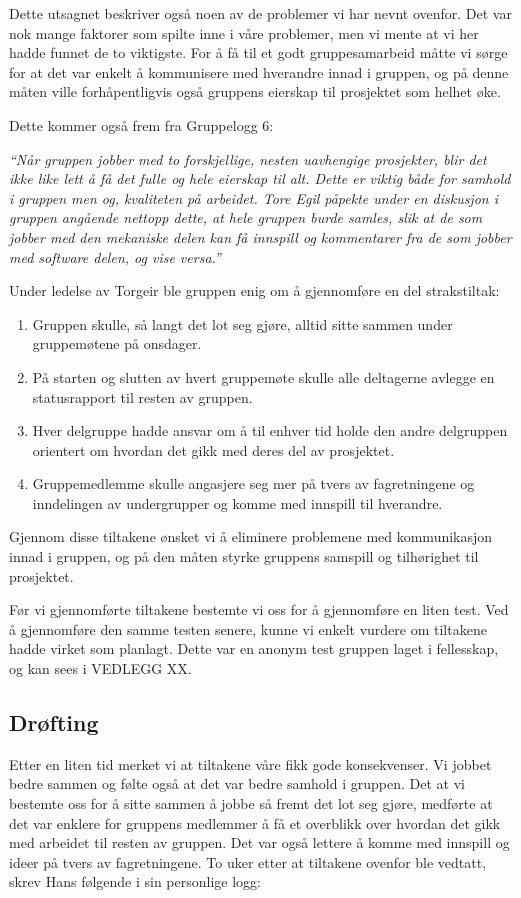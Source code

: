 Dette utsagnet beskriver også noen av de problemer vi har nevnt ovenfor. Det var nok mange faktorer som spilte inne i våre problemer, men vi mente at vi her hadde funnet de to viktigste. For å få til et godt gruppesamarbeid måtte vi sørge for at det var enkelt å kommunisere med hverandre innad i gruppen, og på denne måten ville forhåpentligvis også gruppens eierskap til prosjektet som helhet øke.

Dette kommer også frem fra Gruppelogg 6:\newline

\emph{``Når gruppen jobber med to forskjellige, nesten uavhengige prosjekter, blir det ikke like lett å få det fulle og hele eierskap til alt. Dette er viktig både for samhold i gruppen men og, kvaliteten på arbeidet. Tore Egil påpekte under en diskusjon i gruppen angående nettopp dette, at hele gruppen burde samles, slik at de som jobber med den mekaniske delen kan få innspill og kommentarer fra de som jobber med software delen, og vise versa.''}\newline

Under ledelse av Torgeir ble gruppen enig om å gjennomføre en del strakstiltak:

\begin{enumerate}
\item Gruppen skulle, så langt det lot seg gjøre, alltid sitte sammen under gruppemøtene på onsdager. 
\item På starten og slutten av hvert gruppemøte skulle alle deltagerne avlegge en statusrapport til resten av gruppen. 
\item Hver delgruppe hadde ansvar om å til enhver tid holde den andre delgruppen orientert om hvordan det gikk med deres del av prosjektet.
\item Gruppemedlemme skulle angasjere seg mer på tvers av fagretningene og inndelingen av undergrupper og komme med innspill til hverandre. 
\end{enumerate}

Gjennom disse tiltakene ønsket vi å eliminere problemene med kommunikasjon innad i gruppen, og på den måten styrke gruppens samspill og tilhørighet til prosjektet.\newline

Før vi gjennomførte tiltakene bestemte vi oss for å gjennomføre en liten test. Ved å gjennomføre den samme testen senere, kunne vi enkelt vurdere om tiltakene hadde virket som planlagt. Dette var en anonym test gruppen laget i fellesskap, og kan sees i VEDLEGG XX.
\subsection{Drøfting}
Etter en liten tid merket vi at tiltakene våre fikk gode konsekvenser. Vi jobbet bedre sammen og følte også at det var bedre samhold i gruppen. 
Det at vi bestemte oss for å sitte sammen å jobbe så fremt det lot seg gjøre, medførte at det var enklere for gruppens medlemmer å få et overblikk over hvordan det gikk med arbeidet til resten av gruppen. Det var også lettere å komme med innspill og ideer på tvers av fagretningene. 
To uker etter at tiltakene ovenfor ble vedtatt, skrev Hans følgende i sin personlige logg:\newline

